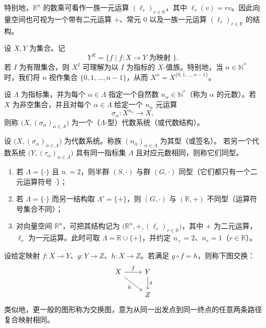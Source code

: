 \documentclass[lang=cn,a4paper,newtx]{elegantbook}
\begin{document}
\medskip
\noindent 特别地，$\mathbb R^n$ 的数乘可看作一族一元运算 $(\ell_r)_{r\in\mathbb R}$，其中 $\ell_r(v)=rv$。因此向量空间也可视为一个带有二元运算 $+$、常元 $0$ 以及一族一元运算 $(\ell_r)_{r\in\mathbb R}$ 的结构。

\medskip
\begin{definition}[幂与函数集]
设 $X,Y$ 为集合。记
\[
  Y^{X}=\{f\mid f:X\to Y\text{ 为映射 }\}.
\]
若 $I$ 为有限集合，则 $X^{I}$ 可理解为以 $I$ 为指标的 $X$-值族。特别地，当 $n\in\mathbb N^{*}$ 时，我们将 $n$ 视作集合 $\{0,1,\dots,n-1\}$，从而 $X^{n}=X^{\{0,1,\dots,n-1\}}$。
\end{definition}

\begin{definition}[代数系统]
设 $\Lambda$ 为指标集，并为每个 $\alpha\in\Lambda$ 指定一个自然数 $n_{\alpha}\in\mathbb N^{*}$（称为 $\alpha$ 的元数）。若 $X$ 为非空集合，并且对每个 $\alpha\in\Lambda$ 给定一个 $n_{\alpha}$ 元运算
\[
  \sigma_{\alpha}:X^{n_{\alpha}}\to X,
\]
则称 $\bigl(X,(\sigma_{\alpha})_{\alpha\in\Lambda}\bigr)$ 为一个（$\Lambda$-型）代数系统（或代数结构）。
\end{definition}

\begin{definition}[型与同型]
设 $\bigl(X,(\sigma_{\alpha})_{\alpha\in\Lambda}\bigr)$ 为代数系统。称族 $(n_{\alpha})_{\alpha\in\Lambda}$ 为其型（或签名）。
若另一个代数系统 $\bigl(Y,(\tau_{\alpha})_{\alpha\in\Lambda}\bigr)$ 具有同一指标集 $\Lambda$ 且对应元数相同，则称它们同型。
\end{definition}

\begin{example}
\leavevmode
\begin{enumerate}
  \item 若 $\Lambda=\{\cdot\}$ 且 $n_{\cdot}=2$，则半群 $(S,\cdot)$ 与群 $(G,\cdot)$ 同型（它们都只有一个二元运算符号 $\cdot$）；
  \item 若 $\Lambda=\{\cdot\}$ 而另一结构取 $\Lambda'=\{+\}$，则 $(G,\cdot)$ 与 $(\mathbb R,+)$ 不同型（运算符号集合不同）；
  \item 对向量空间 $\mathbb R^n$，可把其结构记为 $\bigl(\mathbb R^n,+,(\ell_r)_{r\in\mathbb R}\bigr)$，其中 $+$ 为二元运算，$\ell_r$ 为一元运算。此时可取 $\Lambda=\mathbb R\cup\{+\}$，并约定 $n_{+}=2$、$n_{r}=1$（$r\in\mathbb R$）。
\end{enumerate}
\end{example}

\begin{definition}[交换图]
设给定映射 $f:X\to Y$、$g:Y\to Z$、$h:X\to Z$。若满足 $g\circ f=h$，则称下图交换：
\[
\begin{tikzcd}
X \arrow[r,"f"] \arrow[dr,"h"'] & Y \arrow[d,"g"] \\
& Z
\end{tikzcd}
\]
类似地，更一般的图形称为交换图，意为从同一出发点到同一终点的任意两条路径复合映射相同。
\end{definition}
\end{document}
